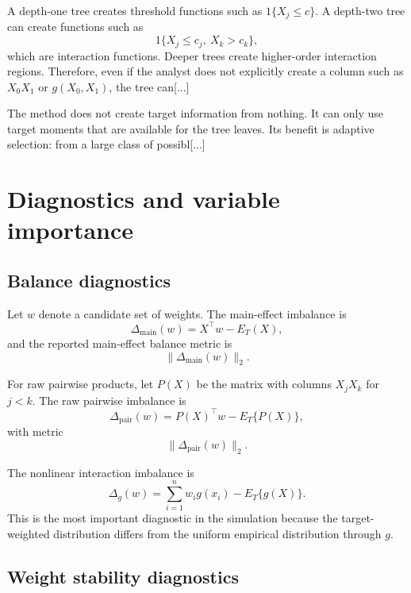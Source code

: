 \documentclass[11pt]{article}
\begin{document}
{A depth-one tree creates threshold functions such as $1\{X_j\leq c\}$. A depth-two tree can create functions such as
\begin{equation*}
1\{X_j\leq c_j,\ X_k>c_k\},
\end{equation*}
which are interaction functions. Deeper trees create higher-order interaction regions. Therefore, even if the analyst does not explicitly create a column such as $X_0X_1$ or $g(X_0,X_1)$, the tree can[...] 

The method does not create target information from nothing. It can only use target moments that are available for the tree leaves. Its benefit is adaptive selection: from a large class of possibl[...]

\section{Diagnostics and variable importance}

\subsection{Balance diagnostics}

Let $w$ denote a candidate set of weights. The main-effect imbalance is
\begin{equation*}
\Delta_{\mathrm{main}}(w)
=
X^\top w-E_T(X),
\end{equation*}
and the reported main-effect balance metric is
\begin{equation*}
\|\Delta_{\mathrm{main}}(w)\|_2.
\end{equation*}

For raw pairwise products, let $P(X)$ be the matrix with columns $X_jX_k$ for $j<k$. The raw pairwise imbalance is
\begin{equation*}
\Delta_{\mathrm{pair}}(w)
=
P(X)^\top w-E_T\{P(X)\},
\end{equation*}
with metric
\begin{equation*}
\|\Delta_{\mathrm{pair}}(w)\|_2.
\end{equation*}

The nonlinear interaction imbalance is
\begin{equation*}
\Delta_g(w)
=
\sum_{i=1}^n w_i g(x_i)-E_T\{g(X)\}.
\end{equation*}
This is the most important diagnostic in the simulation because the target-weighted distribution differs from the uniform empirical distribution through $g$.

\subsection{Weight stability diagnostics}

}
\end{document}
